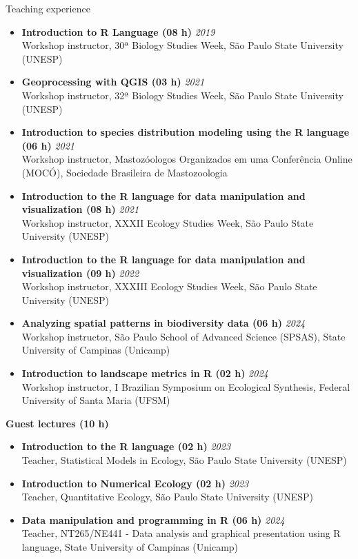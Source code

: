 \documentclass{resume}
\begin{document}
\begin{rSection}{Teaching experience}
\begin{itemize}
\item {\bf Introduction to R Language (08 h)} \hfill{\em 2019}\\
Workshop instructor, 30ª Biology Studies Week, São Paulo State University (UNESP)

\item {\bf Geoprocessing with QGIS (03 h)} \hfill{\em 2021}\\
Workshop instructor, 32ª Biology Studies Week, São Paulo State University (UNESP)

\item {\bf Introduction to species distribution modeling using the R language (06 h)} \hfill{\em 2021}\\
Workshop instructor, Mastozóologos Organizados em uma Conferência Online (MOCÓ), Sociedade Brasileira de Mastozoologia

\item {\bf Introduction to the R language for data manipulation and visualization (08 h)} \hfill{\em 2021}\\
Workshop instructor, XXXII Ecology Studies Week, São Paulo State University (UNESP)

\item {\bf Introduction to the R language for data manipulation and visualization (09 h)} \hfill{\em 2022}\\
Workshop instructor, XXXIII Ecology Studies Week, São Paulo State University (UNESP)

\item {\bf Analyzing spatial patterns in biodiversity data (06 h)} \hfill{\em 2024}\\
Workshop instructor, São Paulo School of Advanced Science (SPSAS), State University of Campinas (Unicamp)

\item {\bf Introduction to landscape metrics in R (02 h)} \hfill{\em 2024}\\
Workshop instructor, I Brazilian Symposium on Ecological Synthesis, Federal University of Santa Maria (UFSM)
\end{itemize}

{\bf Guest lectures (10 h)}
\begin{itemize}
\item {\bf Introduction to the R language (02 h)} \hfill{\em 2023}\\
Teacher, Statistical Models in Ecology, São Paulo State University (UNESP) 

\item {\bf Introduction to Numerical Ecology (02 h)} \hfill{\em 2023}\\
Teacher, Quantitative Ecology, São Paulo State University (UNESP)

\item {\bf Data manipulation and programming in R (06 h)} \hfill{\em 2024}\\
Teacher, NT265/NE441 - Data analysis and graphical presentation using R language, State University of Campinas (Unicamp)
\end{itemize}
\end{rSection}
\end{document}
